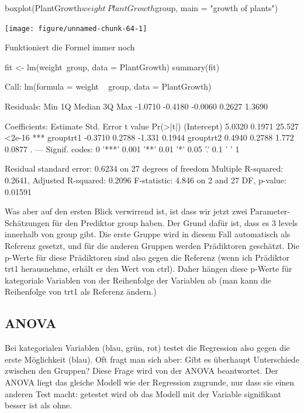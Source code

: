 \documentclass[a4paper,twoside]{tufte-book}\usepackage[]{graphicx}\usepackage[]{color}
\begin{document}
\begin{appendices}
\begin{Schunk}
\begin{Sinput}
boxplot(PlantGrowth$weight~PlantGrowth$group, main = "growth of plants")
\end{Sinput}

\texttt{[image: figure/unnamed-chunk-64-1]} \end{Schunk}

Funktioniert die Formel immer noch

\begin{Schunk}
\begin{Sinput}
fit <- lm(weight~group, data = PlantGrowth)
summary(fit)
\end{Sinput}
\begin{Soutput}

Call:
lm(formula = weight ~ group, data = PlantGrowth)

Residuals:
    Min      1Q  Median      3Q     Max 
-1.0710 -0.4180 -0.0060  0.2627  1.3690 

Coefficients:
            Estimate Std. Error t value Pr(>|t|)    
(Intercept)   5.0320     0.1971  25.527   <2e-16 ***
grouptrt1    -0.3710     0.2788  -1.331   0.1944    
grouptrt2     0.4940     0.2788   1.772   0.0877 .  
---
Signif. codes:  0 '***' 0.001 '**' 0.01 '*' 0.05 '.' 0.1 ' ' 1

Residual standard error: 0.6234 on 27 degrees of freedom
Multiple R-squared:  0.2641,	Adjusted R-squared:  0.2096 
F-statistic: 4.846 on 2 and 27 DF,  p-value: 0.01591
\end{Soutput}
\end{Schunk}

Was aber auf den ersten Blick verwirrend ist, ist dass wir jetzt zwei Parameter-Schätzungen für den Prediktor group haben. Der Grund dafür ist, dass es 3 levels innerhalb von group gibt. Die erste Gruppe wird in diesem Fall automatisch als Referenz gesetzt, und für die anderen Gruppen werden Prädiktoren geschätzt. Die p-Werte für diese Prädiktoren sind also gegen die Referenz (wenn ich Prädiktor trt1 herausnehme, erhält er den Wert von ctrl). Daher hängen diese p-Werte für kategoriale Variablen von der Reihenfolge der Variablen ab (man kann die Reihenfolge von trt1 als Referenz ändern.)


\subsection{ANOVA}

Bei kategorialen Variablen (blau, grün, rot) testet die Regression also gegen die erste Möglichkeit (blau). Oft fragt man sich aber: Gibt es überhaupt Unterschiede zwischen den Gruppen? Diese Frage wird von der ANOVA beantwortet. Der ANOVA liegt das gleiche Modell wie der Regression zugrunde, nur dass sie einen anderen Test macht: getestet wird ob das Modell mit der Variable signifikant besser ist als ohne. 


\end{appendices}
\end{document}
